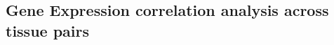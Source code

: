 \documentclass{bioinfo}
\def\CorShrink{\texttt{CorShrink}}
\def\Robocov{\texttt{Robocov}}
\begin{document}





\subsection*{Gene Expression correlation analysis across tissue pairs}
\end{document}
